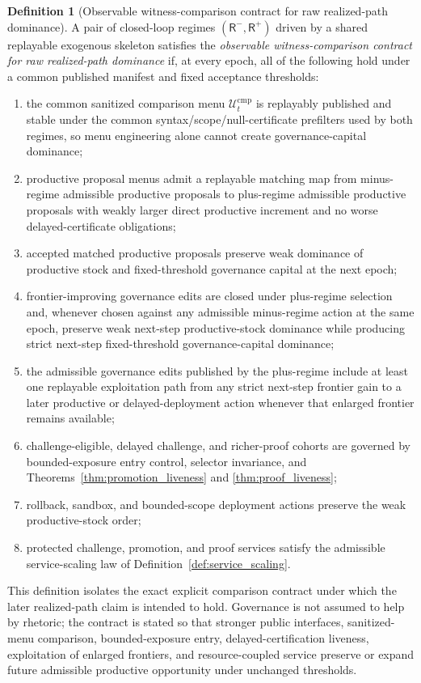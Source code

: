 \documentclass[11pt]{article}
\theoremstyle{definition}
\newtheorem{definition}[theorem]{Definition}
\newcommand{\1}{\mathbf{1}}
\begin{document}
\begin{definition}[Observable witness-comparison contract for raw realized-path dominance]\label{def:gp_class}
A pair of closed-loop regimes $(\mathsf R^-,\mathsf R^+)$ driven by a shared replayable exogenous skeleton satisfies the \emph{observable witness-comparison contract for raw realized-path dominance} if, at every epoch, all of the following hold under a common published manifest and fixed acceptance thresholds:
\begin{enumerate}[label=(\roman*), leftmargin=2em]
  \item the common sanitized comparison menu $\mathcal U_t^{\mathrm{cmp}}$ is replayably published and stable under the common syntax/scope/null-certificate prefilters used by both regimes, so menu engineering alone cannot create governance-capital dominance;
  \item productive proposal menus admit a replayable matching map from minus-regime admissible productive proposals to plus-regime admissible productive proposals with weakly larger direct productive increment and no worse delayed-certificate obligations;
  \item accepted matched productive proposals preserve weak dominance of productive stock and fixed-threshold governance capital at the next epoch;
  \item frontier-improving governance edits are closed under plus-regime selection and, whenever chosen against any admissible minus-regime action at the same epoch, preserve weak next-step productive-stock dominance while producing strict next-step fixed-threshold governance-capital dominance;
  \item the admissible governance edits published by the plus-regime include at least one replayable exploitation path from any strict next-step frontier gain to a later productive or delayed-deployment action whenever that enlarged frontier remains available;
  \item challenge-eligible, delayed challenge, and richer-proof cohorts are governed by bounded-exposure entry control, selector invariance, and Theorems~\ref{thm:promotion_liveness} and \ref{thm:proof_liveness};
  \item rollback, sandbox, and bounded-scope deployment actions preserve the weak productive-stock order;
  \item protected challenge, promotion, and proof services satisfy the admissible service-scaling law of Definition~\ref{def:service_scaling}.
\end{enumerate}
This definition isolates the exact explicit comparison contract under which the later realized-path claim is intended to hold. Governance is not assumed to help by rhetoric; the contract is stated so that stronger public interfaces, sanitized-menu comparison, bounded-exposure entry, delayed-certification liveness, exploitation of enlarged frontiers, and resource-coupled service preserve or expand future admissible productive opportunity under unchanged thresholds.
\end{definition}
\end{document}
